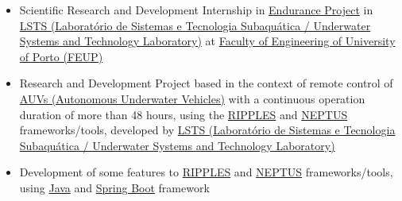 \documentclass[10pt,a4paper,academicons]{altacv}
\begin{document}
\divider

\begin{itemize}
\item Scientific Research and Development Internship in \href{https://lsts.fe.up.pt/our-work/projects}{Endurance Project} in \href{https://lsts.fe.up.pt/}{LSTS (Laboratório de Sistemas e Tecnologia Subaquática / Underwater Systems and Technology Laboratory)} at \href{https://sigarra.up.pt/feup/pt/web_page.inicial}{Faculty of Engineering of University of Porto (FEUP)}
\item Research and Development Project based in the context of remote control of \href{https://en.wikipedia.org/wiki/Autonomous_underwater_vehicle/}{AUVs (Autonomous Underwater Vehicles)} with a continuous operation duration of more than 48 hours, using the \href{https://lsts.fe.up.pt/toolchain/ripples/}{RIPPLES} and \href{https://lsts.fe.up.pt/toolchain/neptus/}{NEPTUS} frameworks/tools, developed by \href{https://lsts.fe.up.pt/}{LSTS (Laboratório de Sistemas e Tecnologia Subaquática / Underwater Systems and Technology Laboratory)}
\item Development of some features to \href{https://lsts.fe.up.pt/toolchain/ripples/}{RIPPLES} and \href{https://lsts.fe.up.pt/toolchain/neptus/}{NEPTUS} frameworks/tools, using \href{https://www.java.com/}{Java} and \href{http://spring.io/projects/spring-boot}{Spring Boot} framework
\end{itemize}

\divider

\clearpage

\end{document}
